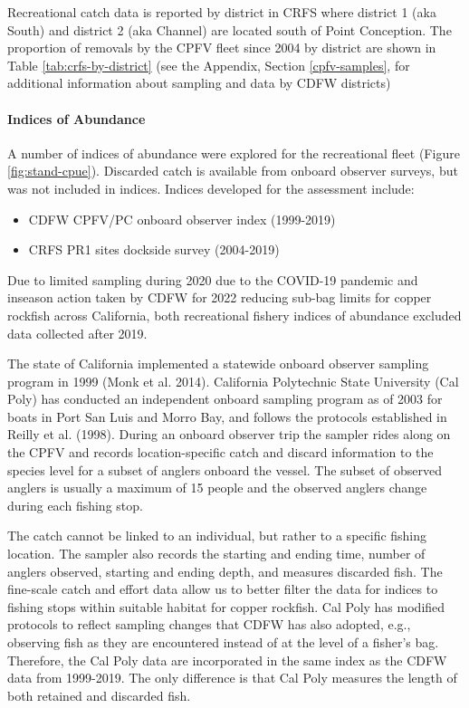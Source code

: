 \documentclass[11pt,
  english,
  letterpaper,
]{article}
\providecommand{\tightlist}{%
  \setlength{\itemsep}{0pt}\setlength{\parskip}{0pt}}
\providecommand{\tightlist}{%
  \setlength{\itemsep}{0pt}\setlength{\parskip}{0pt}}
\begin{document}
Recreational catch data is reported by district in CRFS where district 1 (aka South) and district 2 (aka Channel) are located south of Point Conception. The proportion of removals by the CPFV fleet since 2004 by district are shown in Table \ref{tab:crfs-by-district} (see the Appendix, Section \ref{cpfv-samples}, for additional information about sampling and data by CDFW districts)

\hypertarget{indices-of-abundance}{%
\paragraph{Indices of Abundance}\label{indices-of-abundance}}

\hfill\break

A number of indices of abundance were explored for the recreational fleet (Figure \ref{fig:stand-cpue}). Discarded catch is available from onboard observer surveys, but was not included in indices. Indices developed for the assessment include:

\begin{itemize}
\tightlist
\item
  CDFW CPFV/PC onboard observer index (1999-2019)
\item
  CRFS PR1 sites dockside survey (2004-2019)
\end{itemize}

Due to limited sampling during 2020 due to the COVID-19 pandemic and inseason action taken by CDFW for 2022 reducing sub-bag limits for copper rockfish across California, both recreational fishery indices of abundance excluded data collected after 2019.

The state of California implemented a statewide onboard observer sampling program in 1999 (Monk et al. 2014). California Polytechnic State University (Cal Poly) has conducted an independent onboard sampling program as of 2003 for boats in Port San Luis and Morro Bay, and follows the protocols established in Reilly et al. (1998). During an onboard observer trip the sampler rides along on the CPFV and records location-specific catch and discard information to the species level for a subset of anglers onboard the vessel. The subset of observed anglers is usually a maximum of 15 people and the observed anglers change during each fishing stop.

The catch cannot be linked to an individual, but rather to a specific fishing location. The sampler also records the starting and ending time, number of anglers observed, starting and ending depth, and measures discarded fish. The fine-scale catch and effort data allow us to better filter the data for indices to fishing stops within suitable habitat for copper rockfish. Cal Poly has modified protocols to reflect sampling changes that CDFW has also adopted, e.g., observing fish as they are encountered instead of at the level of a fisher's bag. Therefore, the Cal Poly data are incorporated in the same index as the CDFW data from 1999-2019. The only difference is that Cal Poly measures the length of both retained and discarded fish.
\end{document}
